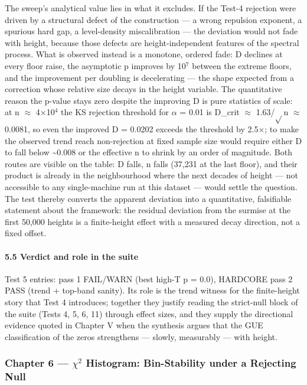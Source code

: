 \documentclass[10pt]{article}
\begin{document}
The sweep's analytical value lies in what it excludes. If the Test-4 rejection were driven by a structural defect of the construction --- a wrong repulsion exponent, a spurious hard gap, a level-density miscalibration --- the deviation would not fade with height, because those defects are height-independent features of the spectral process. What is observed instead is a monotone, ordered fade: D declines at every floor raise, the asymptotic p improves by 10$^7$ between the extreme floors, and the improvement per doubling is decelerating --- the shape expected from a correction whose relative size decays in the height variable. The quantitative reason the p-value stays zero despite the improving D is pure statistics of scale: at n $\approx$ 4$\times$10$^4$ the KS rejection threshold for $\alpha$ = 0.01 is D\_crit $\approx$ 1.63/$\sqrt{}$n $\approx$ 0.0081, so even the improved D = 0.0202 exceeds the threshold by 2.5$\times$; to make the observed trend reach non-rejection at fixed sample size would require either D to fall below \textasciitilde{}0.008 or the effective n to shrink by an order of magnitude. Both routes are visible on the table: D falls, n falls (37,231 at the last floor), and their product is already in the neighbourhood where the next decades of height --- not accessible to any single-machine run at this dataset --- would settle the question. The test thereby converts the apparent deviation into a quantitative, falsifiable statement about the framework: the residual deviation from the surmise at the first 50,000 heights is a finite-height effect with a measured decay direction, not a fixed offset.

\paragraph{5.5 Verdict and role in the suite}

Test 5 entries: pass 1 FAIL/WARN (best high-T p = 0.0), HARDCORE pass 2 PASS (trend + top-band sanity). Its role is the trend witness for the finite-height story that Test 4 introduces; together they justify reading the strict-null block of the suite (Tests 4, 5, 6, 11) through effect sizes, and they supply the directional evidence quoted in Chapter V when the synthesis argues that the GUE classification of the zeros strengthens --- slowly, measurably --- with height.

\subsubsection{Chapter 6 --- $\chi$$^2$ Histogram: Bin-Stability under a Rejecting Null}
\end{document}
